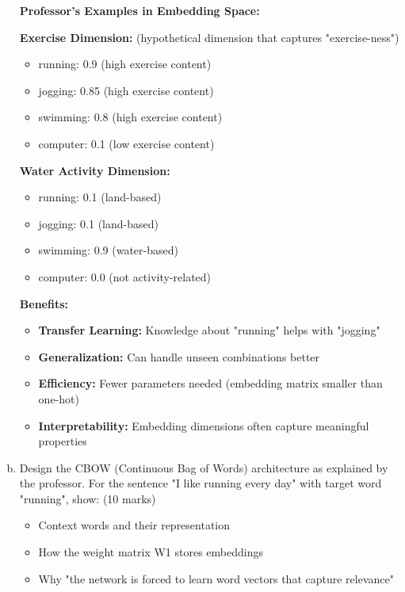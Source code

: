 \documentclass[12pt]{article}
\begin{document}
\begin{enumerate}[(a)]
{    \textbf{Professor's Examples in Embedding Space:}
    
    \textbf{Exercise Dimension:} (hypothetical dimension that captures "exercise-ness")
    \begin{itemize}
        \item running: 0.9 (high exercise content)
        \item jogging: 0.85 (high exercise content)  
        \item swimming: 0.8 (high exercise content)
        \item computer: 0.1 (low exercise content)
    \end{itemize}
    
    \textbf{Water Activity Dimension:}
    \begin{itemize}
        \item running: 0.1 (land-based)
        \item jogging: 0.1 (land-based)
        \item swimming: 0.9 (water-based)
        \item computer: 0.0 (not activity-related)
    \end{itemize}
    
    \textbf{Benefits:}
    \begin{itemize}
        \item \textbf{Transfer Learning:} Knowledge about "running" helps with "jogging"
        \item \textbf{Generalization:} Can handle unseen combinations better
        \item \textbf{Efficiency:} Fewer parameters needed (embedding matrix smaller than one-hot)
        \item \textbf{Interpretability:} Embedding dimensions often capture meaningful properties
    \end{itemize}
    }
    
    \item Design the CBOW (Continuous Bag of Words) architecture as explained by the professor. For the sentence "I like running every day" with target word "running", show: \hfill (10 marks)
    \begin{itemize}
        \item Context words and their representation
        \item How the weight matrix W1 stores embeddings
        \item Why "the network is forced to learn word vectors that capture relevance"
    \end{itemize}
    

\end{enumerate}
\end{document}
